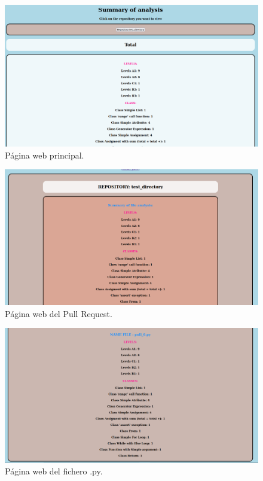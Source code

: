 \documentclass[a4paper, 12pt]{book}
\begin{document}
\begin{figure}
  \centering
  \includegraphics[width=1\textwidth]{img/uso3.png}
  \caption{Página web principal.}\label{fig:uso3}
\end{figure}

\begin{figure}
  \centering
  \includegraphics[width=1\textwidth]{img/uso4.png}
  \caption{Página web del Pull Request.}\label{fig:uso4}
\end{figure}

\begin{figure}
  \centering
  \includegraphics[width=1\textwidth]{img/uso5.png}
  \caption{Página web del fichero .py.}\label{fig:uso5}
\end{figure}
\end{document}
